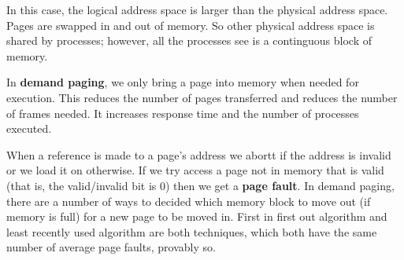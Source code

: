 In this case, the logical address space is larger than the physical address space. Pages are swapped in and out of memory. So other physical address space is shared by processes; however, all the processes see is a continguous block of memory. 

\begin{definition}
    In \textbf{demand paging}, we only bring a page into memory when needed for execution. This reduces the number of pages transferred and reduces the number of frames needed. It increases response time and the number of processes executed.
\end{definition}

When a reference is made to a page's address we abortt if the address is invalid or we load it on otherwise. If we try access a page not in memory that is valid (that is, the valid/invalid bit is 0) then we get a \textbf{page fault}. In demand paging, there are a number of ways to decided which memory block to move out (if memory is full) for a new page to be moved in. First in first out algorithm and least recently used algorithm are both techniques, which both have the same number of average page faults, provably so.
